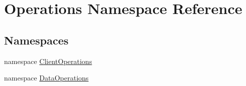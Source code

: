 \hypertarget{namespace_operations}{}\section{Operations Namespace Reference}
\label{namespace_operations}
\subsection*{Namespaces}
\begin{DoxyCompactItemize}
\item 
namespace \hyperlink{namespace_operations_1_1_client_operations}{Client\+Operations}
\item 
namespace \hyperlink{namespace_operations_1_1_data_operations}{Data\+Operations}
\end{DoxyCompactItemize}
